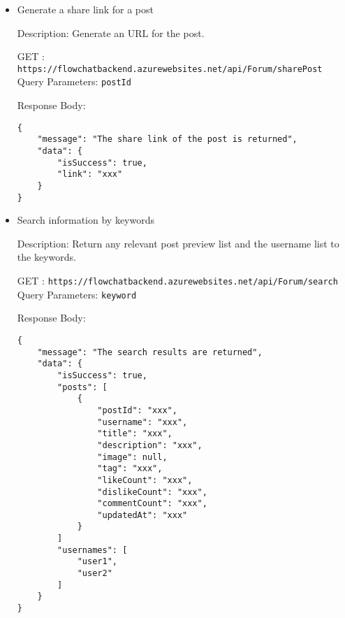 \documentclass[11pt, a4paper]{article}
\begin{document}
\begin{itemize}
Request Body:
    \begin{lstlisting}[breaklines=true, frame=single]
{
    "postId": "xxx",
    "userId": "xxx",
    "action": "unlike" / "undislike"
}
    \end{lstlisting}

    Response Body:
    \begin{lstlisting}[breaklines=true, frame=single]
{
    "message": "The post/comment is un-liked/un-disliked",
    "data": {
        "isSuccess": true
    }
}
    \end{lstlisting}

\item Generate a share link for a post

Description: Generate an URL for the post. 

GET :  \texttt{https://flowchatbackend.azurewebsites.net/api/Forum/sharePost}\\
Query Parameters: \verb|postId|
    
Response Body:
    \begin{lstlisting}[breaklines=true, frame=single]
{
    "message": "The share link of the post is returned",
    "data": {
        "isSuccess": true,
        "link": "xxx"
    }
}
    \end{lstlisting}

\item Search information by keywords

Description: Return any relevant post preview list and the username list to the keywords. 

GET :  \texttt{https://flowchatbackend.azurewebsites.net/api/Forum/search}\\
Query Parameters: \verb|keyword|
    
Response Body:
    \begin{lstlisting}[breaklines=true, frame=single]
{
    "message": "The search results are returned",
    "data": {
        "isSuccess": true,
        "posts": [
            {
                "postId": "xxx",
                "username": "xxx",
                "title": "xxx",
                "description": "xxx",
                "image": null,
                "tag": "xxx",
                "likeCount": "xxx",
                "dislikeCount": "xxx",
                "commentCount": "xxx",
                "updatedAt": "xxx"
            }
        ]
        "usernames": [
            "user1",
            "user2"
        ]
    }
}
    \end{lstlisting}


\end{itemize}
\end{document}
